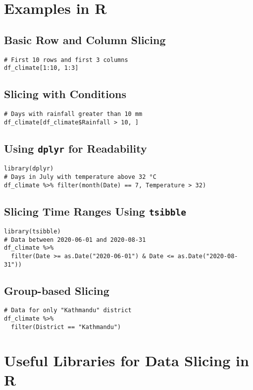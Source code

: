 \section*{Examples in R}

\subsection*{Basic Row and Column Slicing}
\begin{verbatim}
# First 10 rows and first 3 columns 
df_climate[1:10, 1:3]
\end{verbatim}

\subsection*{Slicing with Conditions}
\begin{verbatim}
# Days with rainfall greater than 10 mm
df_climate[df_climate$Rainfall > 10, ]
\end{verbatim}

\subsection*{Using \texttt{dplyr} for Readability}
\begin{verbatim}
library(dplyr)
# Days in July with temperature above 32 °C 
df_climate %>% filter(month(Date) == 7, Temperature > 32)
\end{verbatim}

\subsection*{Slicing Time Ranges Using \texttt{tsibble}}
\begin{verbatim}
library(tsibble)
# Data between 2020-06-01 and 2020-08-31 
df_climate %>%
  filter(Date >= as.Date("2020-06-01") & Date <= as.Date("2020-08-31"))
\end{verbatim}

\subsection*{Group-based Slicing}
\begin{verbatim}
# Data for only "Kathmandu" district
df_climate %>%
  filter(District == "Kathmandu")
\end{verbatim}

\section*{Useful Libraries for Data Slicing in R}

